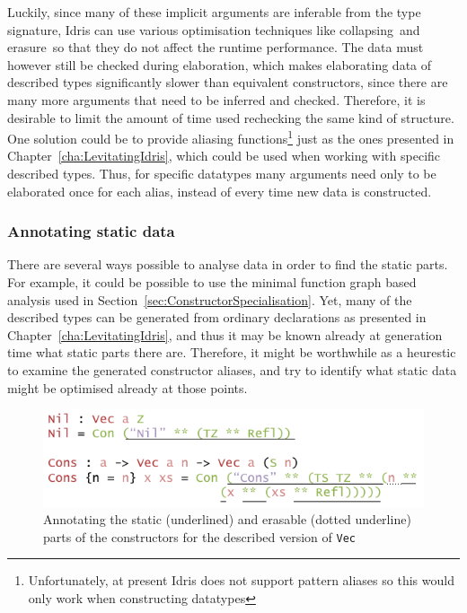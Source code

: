 \documentclass{ituthesis}
\newcommand{\tttype}[1]{\textcolor{type-color}{\texttt{#1}}}
\theoremstyle{break}
\begin{document}
Luckily, since many of these implicit arguments are inferable from the type signature, Idris can use various optimisation techniques like collapsing\,\autocite{Brady04inductivefamilies} and erasure\,\autocite{tejiscak2014erasure} so that they do not affect the runtime performance.
The data must however still be checked during elaboration, which makes elaborating data of described types significantly slower than equivalent constructors, since there are many more arguments that need to be inferred and checked.
Therefore, it is desirable to limit the amount of time used rechecking the same kind of structure.
One solution could be to provide aliasing functions\footnote{Unfortunately, at present Idris does not support pattern aliases so this would only work when constructing datatypes}
just as the ones presented in Chapter~\ref{cha:LevitatingIdris}, which could be used when working with specific described types.
Thus, for specific datatypes many arguments need only to be elaborated once for each alias, instead of every time new data is constructed.

\subsubsection{Annotating static data}
\label{ssub:Annotating static data}
There are several ways possible to analyse data in order to find the static parts.
For example, it could be possible to use the minimal function graph based analysis used in Section~\ref{sec:ConstructorSpecialisation}.
Yet, many of the described types can be generated from ordinary declarations as presented in Chapter~\ref{cha:LevitatingIdris}, and thus it may be known already at generation time what static parts there are.
Therefore, it might be worthwhile as a heurestic to examine the generated constructor aliases, and try to identify what static data might be optimised already at those points.

\begin{figure}[ht]
\begin{center}
    \includegraphics[scale=0.5]{Figures/VectorSynthesisedConstructorsAnalysis.png}
\end{center}
\caption{Annotating the static (underlined) and erasable (dotted underline) parts of the constructors for the described version of \tttype{Vec}}
\label{fig:btvecctors}
\end{figure}
\end{document}
